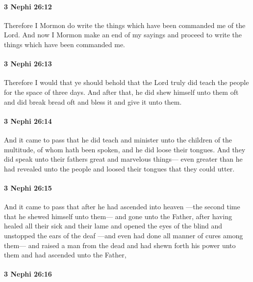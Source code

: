 		\paragraph{3 Nephi 26:12} %
			\label{3NEPHI-26-12}

			Therefore I Mormon do write the things
			which have been commanded me of the Lord.
			And now I Mormon make an end of my sayings
			and proceed to write the things which have been commanded me.

		\paragraph{3 Nephi 26:13} %
			\label{3NEPHI-26-13}

			Therefore I would that ye should behold
			that the Lord truly did teach the people for the space of three days.
			And after that, he did shew himself unto them oft
			and did break bread oft and bless it and give it unto them.

		\paragraph{3 Nephi 26:14} %
			\label{3NEPHI-26-14}

			And it came to pass that he did teach and minister
			unto the children of the multitude, of whom hath been spoken,
			and he did loose their tongues.
			And they did speak unto their fathers great and marvelous things---
			even greater than he had revealed unto the people
			and loosed their tongues that they could utter.

		\paragraph{3 Nephi 26:15} %
			\label{3NEPHI-26-15}

			And it came to pass that after he had ascended into heaven
			---the second time that he shewed himself unto them---
			and gone unto the Father,
			after having healed all their sick and their lame
			and opened the eyes of the blind and unstopped the ears of the deaf
			---and even had done all manner of cures among them---
			and raised a man from the dead
			and had shewn forth his power unto them
			and had ascended unto the Father,

		\paragraph{3 Nephi 26:16} %
			\label{3NEPHI-26-16}

